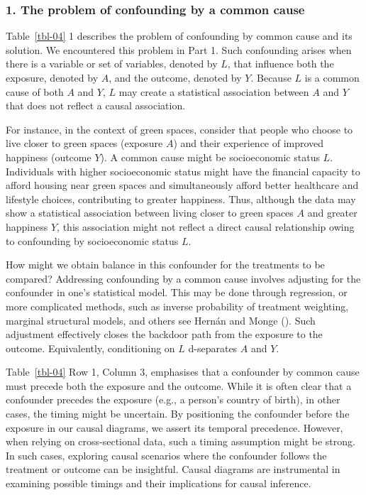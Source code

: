 \documentclass[
  singlecolumn]{article}
\begin{document}
\subsubsection{1. The problem of confounding by a common
cause}\label{the-problem-of-confounding-by-a-common-cause}

Table~\ref{tbl-04} 1 describes the problem of confounding by common
cause and its solution. We encountered this problem in Part 1. Such
confounding arises when there is a variable or set of variables, denoted
by \(L\), that influence both the exposure, denoted by \(A\), and the
outcome, denoted by \(Y.\) Because \(L\) is a common cause of both \(A\)
and \(Y\), \(L\) may create a statistical association between \(A\) and
\(Y\) that does not reflect a causal association.

For instance, in the context of green spaces, consider that people who
choose to live closer to green spaces (exposure \(A\)) and their
experience of improved happiness (outcome \(Y\)). A common cause might
be socioeconomic status \(L\). Individuals with higher socioeconomic
status might have the financial capacity to afford housing near green
spaces and simultaneously afford better healthcare and lifestyle
choices, contributing to greater happiness. Thus, although the data may
show a statistical association between living closer to green spaces
\(A\) and greater happiness \(Y\), this association might not reflect a
direct causal relationship owing to confounding by socioeconomic status
\(L\).

How might we obtain balance in this confounder for the treatments to be
compared? Addressing confounding by a common cause involves adjusting
for the confounder in one's statistical model. This may be done through
regression, or more complicated methods, such as inverse probability of
treatment weighting, marginal structural models, and others see Hernán
and Monge (). Such adjustment
effectively closes the backdoor path from the exposure to the outcome.
Equivalently, conditioning on \(L\) d-separates \(A\) and \(Y\).

Table~\ref{tbl-04} Row 1, Column 3, emphasises that a confounder by
common cause must precede both the exposure and the outcome. While it is
often clear that a confounder precedes the exposure (e.g., a person's
country of birth), in other cases, the timing might be uncertain. By
positioning the confounder before the exposure in our causal diagrams,
we assert its temporal precedence. However, when relying on
cross-sectional data, such a timing assumption might be strong. In such
cases, exploring causal scenarios where the confounder follows the
treatment or outcome can be insightful. Causal diagrams are instrumental
in examining possible timings and their implications for causal
inference.
\end{document}
